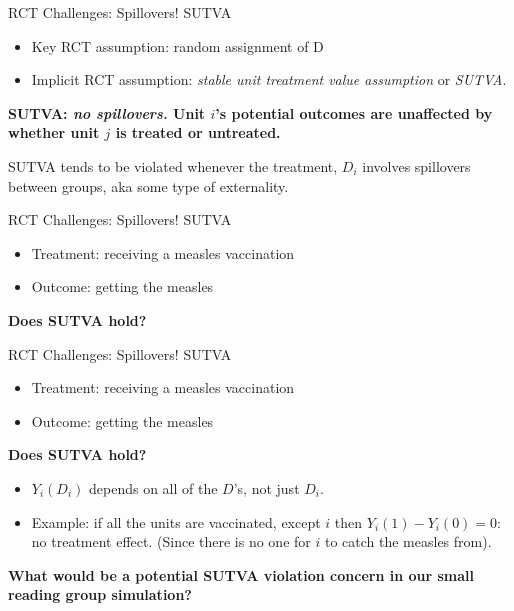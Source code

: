 \documentclass[
  ignorenonframetext,
]{beamer}
\begin{document}
\begin{frame}{RCT Challenges: Spillovers! SUTVA}
\protect\hypertarget{rct-challenges-spillovers-sutva}{}
\begin{itemize}
\item
  Key RCT assumption: random assignment of D
\item
  Implicit RCT assumption:
  \textit{stable unit treatment value assumption} or \textit{SUTVA}.
\end{itemize}

\textbf{SUTVA: \textit{no spillovers.} Unit \(i\)'s potential outcomes
are unaffected by whether unit \(j\) is treated or untreated.}

SUTVA tends to be violated whenever the treatment, \(D_i\) involves
spillovers between groups, aka some type of externality.
\end{frame}

\begin{frame}{RCT Challenges: Spillovers! SUTVA}
\protect\hypertarget{rct-challenges-spillovers-sutva-1}{}
\begin{itemize}
\item
  Treatment: receiving a measles vaccination
\item
  Outcome: getting the measles
\end{itemize}

\textbf{Does SUTVA hold?}
\end{frame}

\begin{frame}{RCT Challenges: Spillovers! SUTVA}
\protect\hypertarget{rct-challenges-spillovers-sutva-2}{}
\begin{itemize}
\item
  Treatment: receiving a measles vaccination
\item
  Outcome: getting the measles
\end{itemize}

\textbf{Does SUTVA hold?}

\begin{itemize}
\item
  \(Y_i(D_i)\) depends on all of the \(D\)'s, not just \(D_i\).
\item
  Example: if all the units are vaccinated, except \(i\) then
  \(Y_i(1)-Y_i(0)=0\): no treatment effect. (Since there is no one for
  \(i\) to catch the measles from).
\end{itemize}

\textbf{What would be a potential SUTVA violation concern in our small
reading group simulation?}
\end{frame}
\end{document}

